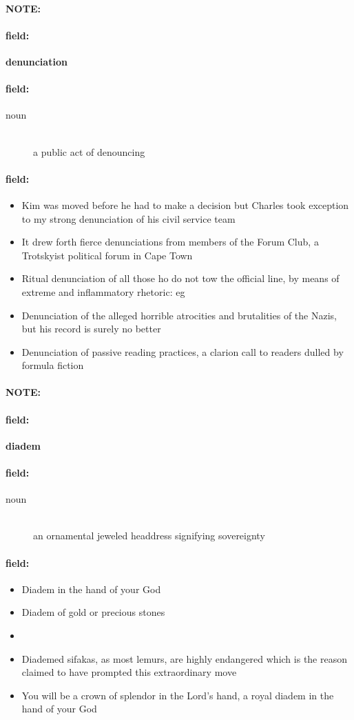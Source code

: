 \documentclass[12pt]{article}
\newenvironment{note}{\paragraph{NOTE:}}{}
\newenvironment{field}{\paragraph{field:}}{}
\begin{document}
\begin{note}
\begin{field}
\textbf{\large denunciation}
\end{field}


\begin{field}
\begin{description}
\item[noun] \hfill \\ 
a public act of denouncing

\end{description}
\end{field}

\begin{field}
\begin{itemize}
\item Kim was moved before he had to make a decision but Charles took exception to my strong denunciation of his civil service team
\item It drew forth fierce denunciations from members of the Forum Club, a Trotskyist political forum in Cape Town
\item Ritual denunciation of all those ho do not tow the official line, by means of extreme and inflammatory rhetoric: eg
\item Denunciation of the alleged horrible atrocities and brutalities of the Nazis, but his record is surely no better
\item Denunciation of passive reading practices, a clarion call to readers dulled by formula fiction
\end{itemize}
\end{field}
\end{note}
\begin{note}
\begin{field}
\textbf{\large diadem}
\end{field}


\begin{field}
\begin{description}
\item[noun] \hfill \\ 
an ornamental jeweled headdress signifying sovereignty

\end{description}
\end{field}

\begin{field}
\begin{itemize}
\item Diadem in the hand of your God
\item Diadem of gold or precious stones
\item 
\item Diademed sifakas, as most lemurs, are highly endangered which is the reason claimed to have prompted this extraordinary move
\item You will be a crown of splendor in the Lord's hand, a royal diadem in the hand of your God
\end{itemize}
\end{field}
\end{note}
\end{document}
